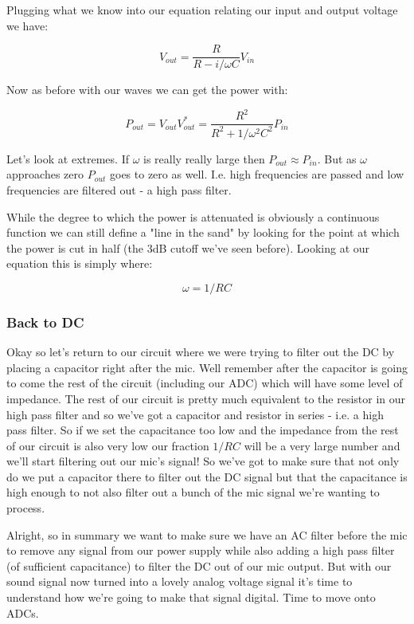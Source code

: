 \documentclass[10pt,a5paper]{book}
\begin{document}
Plugging what we know into our equation relating our input and output voltage we have:

\begin{equation}
V_{out}=\frac{R}{R - i/\omega C }V_{in}
\end{equation}

Now as before with our waves we can get the power with:

\begin{equation}
P_{out}=V_{out}V_{out}^*=\frac{R^2}{R^2+1/\omega^2 C^2}P_{in}
\end{equation}

Let's look at extremes. If $\omega$ is really really large then $P_{out}\approx P_{in}$. But as $\omega$ approaches zero $P_{out}$ goes to zero as well. I.e. high frequencies are passed and low frequencies are filtered out - a high pass filter. 

While the degree to which the power is attenuated is obviously a continuous function we can still define a "line in the sand" by looking for the point at which the power is cut in half (the 3dB cutoff we've seen before). Looking at our equation this is simply where:

\begin{equation}
\omega=1/RC
\end{equation}

\subsubsection{Back to DC}

Okay so let's return to our circuit where we were trying to filter out the DC by placing a capacitor right after the mic. Well remember after the capacitor is going to come the rest of the circuit (including our ADC) which will have some level of impedance. The rest of our circuit is pretty much equivalent to the resistor in our high pass filter and so we've got a capacitor and resistor in series - i.e. a high pass filter. So if we set the capacitance too low and the impedance from the rest of our circuit is also very low our fraction $1/RC$ will be a very large number and we'll start filtering out our mic's signal! So we've got to make sure that not only do we put a capacitor there to filter out the DC signal but that the capacitance is high enough to not also filter out a bunch of the mic signal we're wanting to process. 


Alright, so in summary we want to make sure we have an AC filter before the mic to remove any signal from our power supply while also adding a high pass filter (of sufficient capacitance) to filter the DC out of our mic output. But with our sound signal now turned into a lovely analog voltage signal it's time to understand how we're going to make that signal digital. Time to move onto ADCs.
\end{document}
